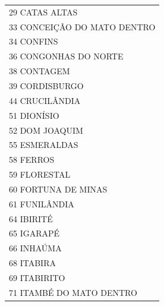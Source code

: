 \documentclass{article}
\begin{document}
\begin{longtable}[c]{m{18cm}}
\multicolumn{1}{l}{ \hspace{2em} 29 CATAS ALTAS } \\
\multicolumn{1}{l}{ \hspace{2em} 33 CONCEIÇÃO DO MATO DENTRO } \\
\multicolumn{1}{l}{ \hspace{2em} 34 CONFINS } \\
\multicolumn{1}{l}{ \hspace{2em} 36 CONGONHAS DO NORTE } \\
\multicolumn{1}{l}{ \hspace{2em} 38 CONTAGEM } \\
\multicolumn{1}{l}{ \hspace{2em} 39 CORDISBURGO } \\
\multicolumn{1}{l}{ \hspace{2em} 44 CRUCILÂNDIA } \\
\multicolumn{1}{l}{ \hspace{2em} 51 DIONÍSIO } \\
\multicolumn{1}{l}{ \hspace{2em} 52 DOM JOAQUIM } \\
\multicolumn{1}{l}{ \hspace{2em} 55 ESMERALDAS } \\
\multicolumn{1}{l}{ \hspace{2em} 58 FERROS } \\
\multicolumn{1}{l}{ \hspace{2em} 59 FLORESTAL } \\
\multicolumn{1}{l}{ \hspace{2em} 60 FORTUNA DE MINAS } \\
\multicolumn{1}{l}{ \hspace{2em} 61 FUNILÂNDIA } \\
\multicolumn{1}{l}{ \hspace{2em} 64 IBIRITÉ } \\
\multicolumn{1}{l}{ \hspace{2em} 65 IGARAPÉ } \\
\multicolumn{1}{l}{ \hspace{2em} 66 INHAÚMA } \\
\multicolumn{1}{l}{ \hspace{2em} 68 ITABIRA } \\
\multicolumn{1}{l}{ \hspace{2em} 69 ITABIRITO } \\
\multicolumn{1}{l}{ \hspace{2em} 71 ITAMBÉ DO MATO DENTRO } \\

\end{longtable}
\end{document}
